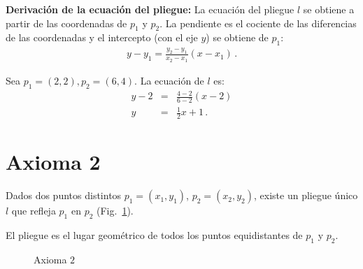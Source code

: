 \noindent\textbf{Derivación de la ecuación del pliegue:}
La ecuación del pliegue $l$ se obtiene a partir de las coordenadas de $p_1$ y $p_2$. La pendiente es el cociente de las diferencias de las coordenadas y el intercepto (con el eje $y$) se obtiene de $p_1$:
\begin{align}
y - y_1 = \frac{y_2-y_1}{x_2-x_1}(x-x_1)\,.
\end{align}

\begin{example}
Sea $p_1=(2,2), p_2=(6,4)$. La ecuación de $l$ es:
\begin{eqnarray*}
y-2&=&\frac{4-2}{6-2}(x-2)\\
y&=&\frac{1}{2}x+1\,.
\end{eqnarray*}
\end{example}



\section{Axioma 2}\label{s.ax2}

\begin{axiom}
Dados dos puntos distintos $p_1=(x_1,y_1)$, $p_2=(x_2,y_2)$, existe un pliegue único $l$ que refleja $p_1$ en $p_2$ (Fig.~\ref{f.origami-axiom2}).
\end{axiom}

El pliegue es el lugar geométrico de todos los puntos equidistantes de $p_1$ y $p_2$.

\begin{figure}[ht]
\begin{center}
\end{center}
\caption{Axioma $2$}\label{f.origami-axiom2}
\end{figure}


